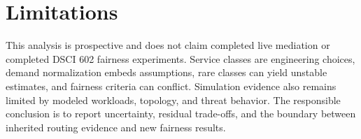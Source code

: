 \documentclass[10pt,conference]{IEEEtran}
\begin{document}
\section{Limitations}
This analysis is prospective and does not claim completed live mediation or completed DSCI 602 fairness experiments. Service classes are engineering choices, demand normalization embeds assumptions, rare classes can yield unstable estimates, and fairness criteria can conflict. Simulation evidence also remains limited by modeled workloads, topology, and threat behavior. The responsible conclusion is to report uncertainty, residual trade-offs, and the boundary between inherited routing evidence and new fairness results.


\end{document}
